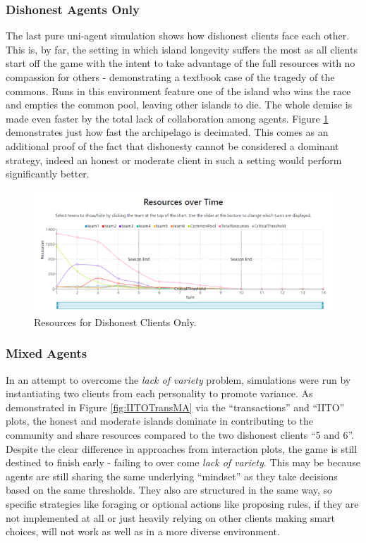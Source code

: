 \subsubsection{Dishonest Agents Only} \label{dishonestAD}
The last pure uni-agent simulation shows how dishonest clients face each other. This is, by far, the setting in which island longevity suffers the most as all clients start off the game with the intent to take advantage of the full resources with no compassion for others - demonstrating a textbook case of the tragedy of the commons. Runs in this environment feature one of the island who wins the race and empties the common pool, leaving other islands to die. The whole demise is made even faster by the total lack of collaboration among agents. Figure \ref{fig:ResourcesDD} demonstrates just how fast the archipelago is decimated. This comes as an additional proof of the fact that dishonesty cannot be considered a dominant strategy, indeed an honest or moderate client in such a setting would perform significantly better.
\begin{figure}[H]
\centering
\includegraphics[scale=0.8]{12_team4_agentdesign/images/ResourcesDD.png}
\caption{Resources for Dishonest Clients Only.}
\label{fig:ResourcesDD}
\end{figure}

\subsubsection{Mixed Agents}
In an attempt to overcome the \emph{lack of variety} problem, simulations were run by instantiating two clients from each personality to promote variance. As demonstrated in Figure \ref{fig:IITOTransMA} via the “transactions” and “IITO” plots, the honest and moderate islands dominate in contributing to the community and share resources compared to the two dishonest clients “5 and 6”. Despite the clear difference in approaches from interaction plots, the game is still destined to finish early - failing to over come \emph{lack of variety}. This may be because agents are still sharing the same underlying “mindset” as they take decisions based on the same thresholds. They also are structured in the same way, so specific strategies like foraging or optional actions like proposing rules, if they are not implemented at all or just heavily relying on other clients making smart choices, will not work as well as in a more diverse environment.

